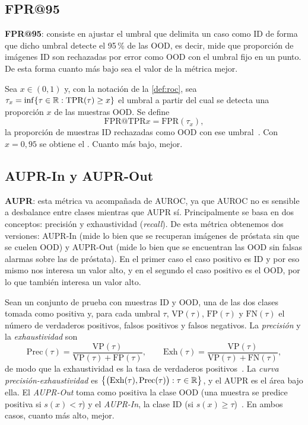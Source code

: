 \subsection{FPR@95}\label{sec:fpr95}

\textbf{FPR@95}: consiste en ajustar el umbral que delimita un caso como ID de forma que dicho umbral detecte el 95\,\% de las OOD, es decir, mide que proporción de imágenes ID
son rechazadas por error como OOD con el umbral fijo en un punto. De esta forma cuanto más bajo sea el valor de la métrica mejor.

\begin{definicion}\label{def:fpr95}
Sea $x \in (0, 1)$ y, con la notación de la \cref{def:roc}, sea
$\tau_x = \inf\{\tau \in \mathbb{R} : \mathrm{TPR}(\tau) \geq x\}$ el umbral a partir del
cual se detecta una proporción $x$ de las muestras OOD. Se define
\[
  \mathrm{FPR@TPR}x = \mathrm{FPR}(\tau_x),
\]
la proporción de muestras ID rechazadas como OOD con ese umbral~\cite{yang2024}. Con
$x = 0{,}95$ se obtiene el . Cuanto más bajo, mejor.
\end{definicion}

\subsection{AUPR-In y AUPR-Out}\label{sec:aupr}

\textbf{AUPR}: esta métrica va acompañada de AUROC, ya que AUROC no es sensible a desbalance entre clases mientras que AUPR sí. Principalmente se basa en dos conceptos: precisión y exhaustividad (\emph{recall}). De esta métrica obtenemos dos versiones: AUPR-In (mide lo bien que se recuperan imágenes de próstata sin que se cuelen OOD) y AUPR-Out (mide lo bien que se encuentran las OOD sin falsas alarmas sobre las de próstata). En el primer caso el caso positivo es ID y por eso mismo nos interesa un valor alto, y en el segundo el caso positivo es el OOD, por lo que también interesa un valor alto.
\begin{definicion}\label{def:aupr}
Sean un conjunto de prueba con muestras ID y OOD, una de las dos clases tomada como
positiva y, para cada umbral $\tau$, $\mathrm{VP}(\tau)$, $\mathrm{FP}(\tau)$ y
$\mathrm{FN}(\tau)$ el número de verdaderos positivos, falsos positivos y falsos
negativos. La \emph{precisión} y la \emph{exhaustividad} son
\[
  \mathrm{Prec}(\tau) = \frac{\mathrm{VP}(\tau)}{\mathrm{VP}(\tau) + \mathrm{FP}(\tau)},
  \qquad
  \mathrm{Exh}(\tau) = \frac{\mathrm{VP}(\tau)}{\mathrm{VP}(\tau) + \mathrm{FN}(\tau)},
\]
de modo que la exhaustividad es la tasa de verdaderos positivos~\cite{fawcett2006}. La
\emph{curva precisión-exhaustividad} es
$\bigl\{\bigl(\mathrm{Exh}(\tau), \mathrm{Prec}(\tau)\bigr) : \tau \in \mathbb{R}\bigr\}$, y el
AUPR es el área bajo ella. El \emph{AUPR-Out} toma como positiva la clase OOD (una
muestra se predice positiva si $s(x) < \tau$) y el \emph{AUPR-In}, la clase ID (si
$s(x) \geq \tau$)~\cite{yang2024}. En ambos casos, cuanto más alto, mejor.
\end{definicion}


